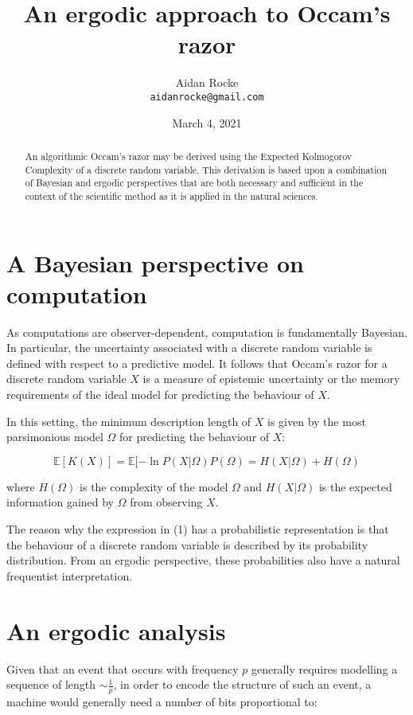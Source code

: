 \documentclass{article}
\title{An ergodic approach to Occam's razor}
\date{March 4, 2021}
\author{%
  Aidan Rocke\\
  \texttt{aidanrocke@gmail.com} \\
}
\begin{document}
\maketitle

\begin{abstract}
An algorithmic Occam's razor may be derived using the Expected Kolmogorov Complexity of a discrete random variable. This derivation is based upon a combination of Bayesian and ergodic perspectives that are both necessary and sufficient in the context of the scientific method as it is applied in the natural sciences. 
\end{abstract}


\section{A Bayesian perspective on computation}

As computations are observer-dependent, computation is fundamentally Bayesian. In particular, the uncertainty associated with a discrete random variable is defined with respect to a predictive model.
It follows that Occam's razor for a discrete random variable $X$ is a measure of epistemic uncertainty or the memory
requirements of the ideal model for predicting the behaviour of $X$.

In this setting, the minimum description length of $X$ is given by the most parsimonious model $\Omega$ for
predicting the behaviour of $X$:

\begin{equation}
\mathbb{E}[K(X)] = \mathbb{E}[-\ln P(X\lvert \Omega)P(\Omega) = H(X \lvert \Omega) + H(\Omega)
\end{equation}

where $H(\Omega)$ is the complexity of the model $\Omega$ and $H(X \lvert \Omega)$ is the expected information
gained by $\Omega$ from observing $X$. 

The reason why the expression in (1) has a probabilistic representation is that the behaviour of a discrete random variable
is described by its probability distribution. From an ergodic perspective, these
probabilities also have a natural frequentist interpretation. 

\section{An ergodic analysis}

Given that an event that occurs with frequency $p$ generally requires modelling a sequence of length $\sim \frac{1}{p}$,
in order to encode the structure of such an event, a machine would generally need a number of bits proportional to:
\end{document}
